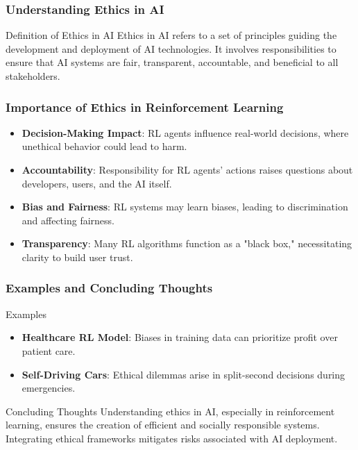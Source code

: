 \documentclass{beamer}
\begin{document}
\begin{frame}[fragile]
    \frametitle{Understanding Ethics in AI}
    \begin{block}{Definition of Ethics in AI}
        Ethics in AI refers to a set of principles guiding the development and deployment of AI technologies. It involves responsibilities to ensure that AI systems are fair, transparent, accountable, and beneficial to all stakeholders.
    \end{block}
\end{frame}

\begin{frame}[fragile]
    \frametitle{Importance of Ethics in Reinforcement Learning}
    \begin{itemize}
        \item \textbf{Decision-Making Impact}: RL agents influence real-world decisions, where unethical behavior could lead to harm.
        
        \item \textbf{Accountability}: Responsibility for RL agents’ actions raises questions about developers, users, and the AI itself.
        
        \item \textbf{Bias and Fairness}: RL systems may learn biases, leading to discrimination and affecting fairness.
        
        \item \textbf{Transparency}: Many RL algorithms function as a "black box," necessitating clarity to build user trust.
    \end{itemize}
\end{frame}

\begin{frame}[fragile]
    \frametitle{Examples and Concluding Thoughts}
    \begin{block}{Examples}
        \begin{itemize}
            \item \textbf{Healthcare RL Model}: Biases in training data can prioritize profit over patient care.
            
            \item \textbf{Self-Driving Cars}: Ethical dilemmas arise in split-second decisions during emergencies.
        \end{itemize}
    \end{block}
    
    \begin{block}{Concluding Thoughts}
        Understanding ethics in AI, especially in reinforcement learning, ensures the creation of efficient and socially responsible systems. Integrating ethical frameworks mitigates risks associated with AI deployment.
    \end{block}
\end{frame}
\end{document}
